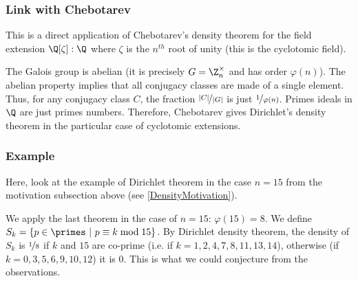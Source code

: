 \subsubsection{Link with Chebotarev}
This is a direct application of Chebotarev's density theorem for the field extension $\Q[\zeta]:\Q$ where $\zeta$ is the $n^{th}$ root of unity (this is the cyclotomic field).

The Galois group is abelian (it is precisely $G=\Z_n^{\times}$ and has order $\varphi(n)$).
The abelian property implies that all conjugacy classes are made of a single element.
Thus, for any conjugacy class $C$, the fraction $\nicefrac{|C|}{|G|}$ is just $\nicefrac{1}{\varphi(n)}$.
Primes ideals in $\Q$ are just primes numbers.
Therefore, Chebotarev gives Dirichlet's density theorem in the particular case of cyclotomic extensions.

\subsubsection{Example}
Here, look at the example of Dirichlet theorem in the case $n=15$ from the motivation subsection above (see \ref{DensityMotivation}).

We apply the last theorem in the case of $n=15$: $\varphi(15)=8$.
We define $S_k = \{ p \in \primes \ | \ p \equiv k \bmod 15 \}$.
By Dirichlet density theorem,  the density of $S_k$ is $\nicefrac{1}{8}$ if $k$ and $15$ are co-prime (i.e. if $k = 1,2,4,7,8,11,13,14$), otherwise (if $k=0,3,5,6,9,10,12$) it is $0$.
This is what we could conjecture from the observations.










